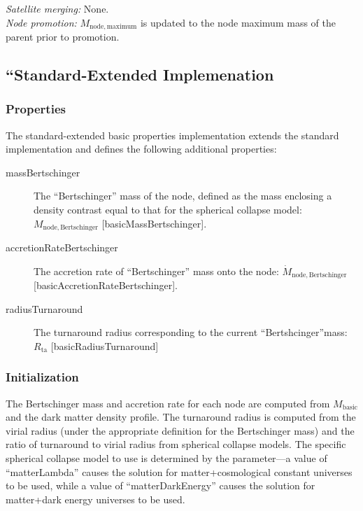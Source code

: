 \noindent\emph{Satellite merging:} None.\\

\noindent\emph{Node promotion:} $M_\mathrm{node, maximum}$ is updated to the \gls{node} maximum mass of the parent prior to promotion.\\

\subsection{``Standard-Extended Implemenation}

\subsubsection{Properties}

The standard-extended basic properties implementation extends the standard implementation and defines the following additional properties:
\begin{description}
 \item [{\normalfont \ttfamily massBertschinger}] The ``Bertschinger'' mass of the node, defined as the mass enclosing a density contrast equal to that for the spherical collapse model: $M_\mathrm{node, Bertschinger}$ [{\normalfont \ttfamily basicMassBertschinger}].
 \item [{\normalfont \ttfamily accretionRateBertschinger}] The accretion rate of ``Bertschinger'' mass onto the node: $\dot{M}_\mathrm{node, Bertschinger}$ [{\normalfont \ttfamily basicAccretionRateBertschinger}].
 \item [{\normalfont \ttfamily radiusTurnaround}] The turnaround radius corresponding to the current ``Bertshcinger''mass: $R_\mathrm{ta}$ [{\normalfont \ttfamily basicRadiusTurnaround}]
\end{description}

\subsubsection{Initialization}

The Bertschinger mass and accretion rate for each node are computed from $M_\mathrm{basic}$ and the dark matter density profile. The turnaround radius is computed from the virial radius (under the appropriate definition for the Bertschinger mass) and the ratio of turnaround to virial radius from spherical collapse models. The specific spherical collapse model to use is determined by the {\normalfont \ttfamily [nodeComponentBasicExtendedSphericalCollapseType]} parameter---a value of ``{\normalfont \ttfamily matterLambda}'' causes the solution for matter+cosmological constant universes to be used, while a value of ``{\normalfont \ttfamily matterDarkEnergy}'' causes the solution for matter+dark energy universes to be used.

